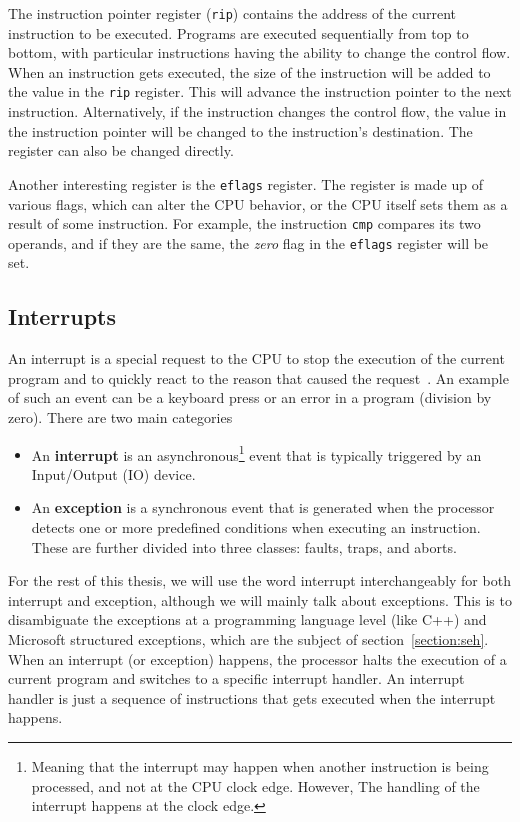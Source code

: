 The instruction pointer register (\texttt{rip}) contains the address of the
current instruction to be executed. Programs are executed sequentially from top
to bottom, with particular instructions having the ability to change the
control flow. When an instruction gets executed, the size of the instruction
will be added to the value in the \texttt{rip} register. This will advance the
instruction pointer to the next instruction. Alternatively, if the instruction
changes the control flow, the value in the instruction pointer will be changed
to the instruction's destination. The register can also be changed directly.

Another interesting register is the \texttt{eflags} register. The register is
made up of various flags, which can alter the CPU behavior, or the CPU itself
sets them as a result of some instruction. For example, the instruction
\texttt{cmp} compares its two operands, and if they are the same, the
\textit{zero} flag in the \texttt{eflags} register will be set.

\subsection{Interrupts}\label{section:interrupts}
An interrupt is a special request to the CPU to stop the execution of the
current program and to quickly react to the reason that caused the
request~\cite{computer-architecture}. An example of such an event can be a
keyboard press or an error in a program (division by zero). There are two main
categories~\cite{intel-manual}
\begin{itemize}
    \item An \textbf{interrupt} is an asynchronous\footnote{Meaning that the
        interrupt may happen when another instruction is being processed, and
        not at the CPU clock edge. However, The handling of the interrupt
        happens at the clock edge.} event that is typically triggered by an
        Input/Output (IO) device.
    \item An \textbf{exception} is a synchronous event that is
        generated when the processor detects one or more predefined conditions
        when executing an instruction. These are further divided into three
        classes: faults, traps, and aborts.
\end{itemize}


For the rest of this thesis, we will use the word interrupt interchangeably for
both interrupt and exception, although we will mainly talk about exceptions.
This is to disambiguate the exceptions at a programming language level (like
C++) and Microsoft structured exceptions, which are the subject of
section~\ref{section:seh}. When an interrupt (or exception) happens, the
processor halts the execution of a current program and switches to a specific
interrupt handler. An interrupt handler is just a sequence of instructions that
gets executed when the interrupt happens. 

